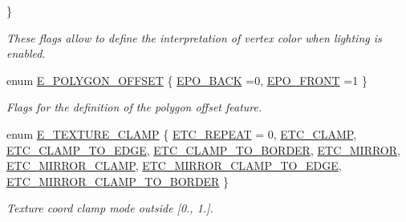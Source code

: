 \begin{DoxyCompactItemize}
 \}\begin{DoxyCompactList}\small\item\em These flags allow to define the interpretation of vertex color when lighting is enabled. \end{DoxyCompactList}
\item 
enum \hyperlink{namespaceirr_1_1video_a812b866b910c946f5bc813f8eab31144}{E\+\_\+\+P\+O\+L\+Y\+G\+O\+N\+\_\+\+O\+F\+F\+S\+ET} \{ \hyperlink{namespaceirr_1_1video_a812b866b910c946f5bc813f8eab31144a73dcec6718742ff2631ab7ca25685b32}{E\+P\+O\+\_\+\+B\+A\+CK} =0, 
\hyperlink{namespaceirr_1_1video_a812b866b910c946f5bc813f8eab31144ae39fa3f07418d3f6f5dd2d245122d2cb}{E\+P\+O\+\_\+\+F\+R\+O\+NT} =1
 \}\begin{DoxyCompactList}\small\item\em Flags for the definition of the polygon offset feature. \end{DoxyCompactList}
\item 
enum \hyperlink{namespaceirr_1_1video_a5d9933edc5ed7704a7a084f84b39811f}{E\+\_\+\+T\+E\+X\+T\+U\+R\+E\+\_\+\+C\+L\+A\+MP} \{ \newline
\hyperlink{namespaceirr_1_1video_a5d9933edc5ed7704a7a084f84b39811fa2e2a1ec3f8045fd2653c4cd6171ac12b}{E\+T\+C\+\_\+\+R\+E\+P\+E\+AT} = 0, 
\hyperlink{namespaceirr_1_1video_a5d9933edc5ed7704a7a084f84b39811fa36f63a356ae97db58914ef8920cae488}{E\+T\+C\+\_\+\+C\+L\+A\+MP}, 
\hyperlink{namespaceirr_1_1video_a5d9933edc5ed7704a7a084f84b39811fac35b809116d29a3c77bab79b6a31eda3}{E\+T\+C\+\_\+\+C\+L\+A\+M\+P\+\_\+\+T\+O\+\_\+\+E\+D\+GE}, 
\hyperlink{namespaceirr_1_1video_a5d9933edc5ed7704a7a084f84b39811fa3c8beb993f3bb31a76a3811eb460882a}{E\+T\+C\+\_\+\+C\+L\+A\+M\+P\+\_\+\+T\+O\+\_\+\+B\+O\+R\+D\+ER}, 
\newline
\hyperlink{namespaceirr_1_1video_a5d9933edc5ed7704a7a084f84b39811fa6c86659cd8f985e5e7701220660d6d76}{E\+T\+C\+\_\+\+M\+I\+R\+R\+OR}, 
\hyperlink{namespaceirr_1_1video_a5d9933edc5ed7704a7a084f84b39811faba0505a920aa4cc0a2ebbd97385a9957}{E\+T\+C\+\_\+\+M\+I\+R\+R\+O\+R\+\_\+\+C\+L\+A\+MP}, 
\hyperlink{namespaceirr_1_1video_a5d9933edc5ed7704a7a084f84b39811faa4629bd5f10231c7e8b765ed6884e7c8}{E\+T\+C\+\_\+\+M\+I\+R\+R\+O\+R\+\_\+\+C\+L\+A\+M\+P\+\_\+\+T\+O\+\_\+\+E\+D\+GE}, 
\hyperlink{namespaceirr_1_1video_a5d9933edc5ed7704a7a084f84b39811fa43169cc95e7157afe93429324a3ba371}{E\+T\+C\+\_\+\+M\+I\+R\+R\+O\+R\+\_\+\+C\+L\+A\+M\+P\+\_\+\+T\+O\+\_\+\+B\+O\+R\+D\+ER}
 \}\begin{DoxyCompactList}\small\item\em Texture coord clamp mode outside \mbox{[}0., 1.\mbox{]}. \end{DoxyCompactList}

\end{DoxyCompactItemize}

